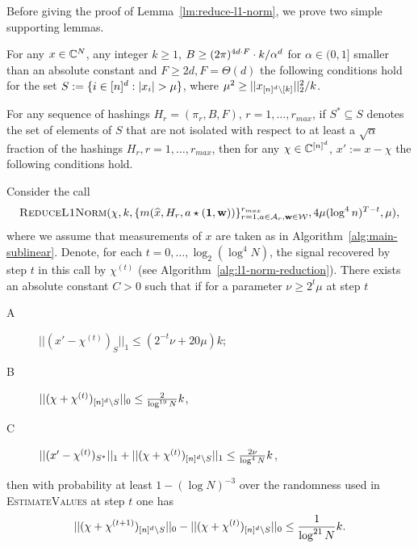 Before giving the proof of Lemma~\ref{lm:reduce-l1-norm}, we prove two simple supporting lemmas.

\begin{lemma}\label{lm:small-l0-increment}
For any $x\in \mathbb{C}^N$, any integer $k\geq 1$, $B\geq (2\pi)^{4d\cdot F}\cdot k/\alpha^d$ for $\alpha\in (0, 1]$ smaller than an absolute constant and $F\geq 2d, F=\Theta(d)$ the following conditions hold for the set $S:=\{i\in \nsq: |x_i|>\mu\}$, where $\mu^2\geq ||x_{{[n]^d}\setminus [k]}||_2^2/k$.

For any sequence of hashings $H_r=(\pi_r, B, F)$, $r=1,\ldots, r_{max}$, if $S^*\subseteq S$ denotes the set of elements of $S$ that are not isolated with respect to at least a $\sqrt{\alpha}$ fraction of the hashings  $H_r, r=1,\ldots, r_{max}$, then for any $\chi\in \mathbb{C}^{[n]^d}$, $x':=x-\chi$ the following conditions hold.

Consider the call 
$$
\Call{ReduceL1Norm}{\chi, k, \{m(\wh{x}, H_r, a\star (\one, \h))\}_{r=1, a\in \A_r, \h\in \H}^{r_{max}}, 4\mu (\log^4 n)^{T-t}, \mu},
$$ 
where we assume that measurements of $x$ are taken as in Algorithm~\ref{alg:main-sublinear}. Denote, for each $t=0,\ldots, \log_2(\log^4 N)$, the signal recovered by step $t$ in this call by $\chi^{(t)}$ (see Algorithm~\ref{alg:l1-norm-reduction}). There exists an absolute constant $C>0$ such that if for a parameter $\nu\geq 2^t\mu$ at step $t$
\begin{description}
\item[A] $||(x'-\chi^{(t)})_S||_1\leq (2^{-t}\nu+20\mu) k$;
\item[B] $||(\chi+\chi^{(t)})_{{[n]^d}\setminus S}||_0\leq \frac2{\log^{19} N} k$,
\item[C] $||(x'-\chi^{(t)})_{S^*}||_1+||(\chi+\chi^{(t)})_{{[n]^d}\setminus S}||_1\leq \frac{2\nu}{\log^4 N} k$,
\end{description}
then  with probability at least $1-(\log N)^{-3}$ over the randomness used in \textsc{EstimateValues} at step $t$ one has
$$
||(\chi+\chi^{(t+1)})_{{[n]^d}\setminus S}||_0-||(\chi+\chi^{(t)})_{{[n]^d}\setminus S}||_0\leq \frac{1}{\log^{21} N}  k.
$$
\end{lemma}
